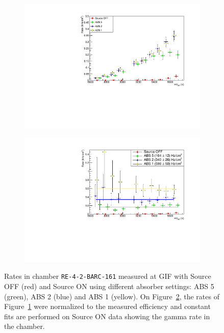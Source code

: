 	\begin{figure}[H]
    	\begin{subfigure}{0.5\linewidth}
			\centering
			\includegraphics[width = 0.7\plotwidth]{fig/chapt5/Gamma-Rate.pdf}
        	\caption{\label{fig:GIFRate:A}}
    	\end{subfigure}
    	\begin{subfigure}{0.5\linewidth}
			\centering
			\includegraphics[width = 0.7\plotwidth]{fig/chapt5/Unconvoluted-Gamma-Rate.pdf}
        	\caption{\label{fig:GIFRate:B}}
    	\end{subfigure}
		\caption{\label{fig:GIFRate} Rates in chamber \texttt{RE-4-2-BARC-161} measured at GIF with Source OFF (red) and Source ON using different absorber settings: ABS 5 (green), ABS 2 (blue) and ABS 1 (yellow). On Figure~\ref{fig:GIFRate:B}, the rates of Figure~\ref{fig:GIFRate:A} were normalized to the measured efficiency and constant fits are performed on Source ON data showing the gamma rate in the chamber.}
	\end{figure}
	

